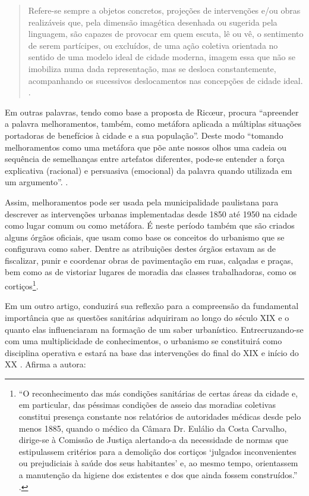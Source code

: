 \begin{refsection}
    \begin{quotation}
        Refere-se sempre a objetos concretos, projeções de intervenções e/ou obras realizáveis que, pela dimensão imagética desenhada ou sugerida pela linguagem, são capazes de provocar em quem escuta, lê ou vê, o sentimento de serem partícipes, ou excluídos, de uma ação coletiva orientada no sentido de uma modelo ideal de cidade moderna, imagem essa que não se imobiliza numa dada representação, mas se desloca constantemente, acompanhando os sucessivos deslocamentos nas concepções de cidade ideal. \cite[p.~351]{Bresciani2001Melhoramentos}.
    \end{quotation}

    Em outras palavras, tendo como base a proposta de Ricœur, \textcite{Bresciani2001Melhoramentos} procura ``apreender a palavra melhoramentos, também, como metáfora aplicada a múltiplas situações portadoras de benefícios à cidade e a sua população''. Deste modo ``tomando melhoramentos como uma metáfora que põe ante nossos olhos uma cadeia ou sequência de semelhanças entre artefatos diferentes, pode-se entender a força explicativa (racional) e persuasiva (emocional) da palavra quando utilizada em um argumento''. \cite[p.~350--351]{Bresciani2001Melhoramentos}.

    Assim, melhoramentos pode ser usada pela municipalidade paulistana para descrever as intervenções urbanas implementadas desde 1850 até 1950 na cidade como lugar comum ou como metáfora. É neste período também que são criados alguns órgãos oficiais, que usam como base os conceitos do urbanismo que se configurava como saber. Dentre as atribuições destes órgãos estavam as de fiscalizar, punir e coordenar obras de pavimentação em ruas, calçadas e praças, bem como as de vistoriar lugares de moradia das classes trabalhadoras, como os cortiços\footnote{``O reconhecimento das más condições sanitárias de certas áreas da cidade e, em particular, das péssimas condições de asseio das moradias coletivas constitui presença constante nos relatórios de autoridades médicas desde pelo menos 1885, quando o médico da Câmara Dr. Eulálio da Costa Carvalho, dirige-se à Comissão de Justiça alertando-a da necessidade de normas que estipulassem critérios para a demolição dos cortiços `julgados inconvenientes ou prejudiciais à saúde dos seus habitantes' e, ao mesmo tempo, orientassem a manutenção da higiene dos existentes e dos que ainda fossem construídos.'' \cite[p.~19]{Bresciani2010Sanitarismo}.}.  

    Em um outro artigo, \textcite{Bresciani2010Sanitarismo} conduzirá sua reflexão para a compreensão da fundamental importância que as questões sanitárias adquiriram ao longo do século XIX e o quanto elas influenciaram na formação de um saber urbanístico. Entrecruzando-se com uma multiplicidade de conhecimentos, o urbanismo se constituirá como disciplina operativa e estará na base das intervenções do final do XIX e início do XX \cite[p.~15]{Bresciani2010Sanitarismo}. Afirma a autora:


\end{refsection}
